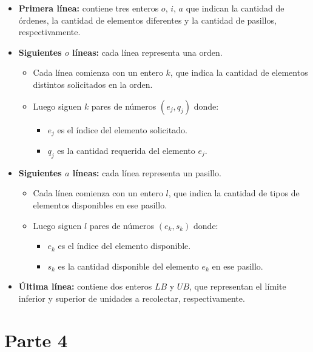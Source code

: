 \documentclass[a4paper,12pt]{article}
\begin{document}
\begin{itemize}
    \item \textbf{Primera línea:} contiene tres enteros $o$, $i$, $a$ que indican la cantidad de órdenes, la cantidad de elementos diferentes y la cantidad de pasillos, respectivamente.

    \item \textbf{Siguientes $o$ líneas:} cada línea representa una orden. 
    \begin{itemize}
        \item Cada línea comienza con un entero $k$, que indica la cantidad de elementos distintos solicitados en la orden.
        \item Luego siguen $k$ pares de números $(e_j, q_j)$ donde:
        \begin{itemize}
            \item $e_j$ es el índice del elemento solicitado.
            \item $q_j$ es la cantidad requerida del elemento $e_j$.
        \end{itemize}
    \end{itemize}

    \item \textbf{Siguientes $a$ líneas:} cada línea representa un pasillo.
    \begin{itemize}
        \item Cada línea comienza con un entero $l$, que indica la cantidad de tipos de elementos disponibles en ese pasillo.
        \item Luego siguen $l$ pares de números $(e_k, s_k)$ donde:
        \begin{itemize}
            \item $e_k$ es el índice del elemento disponible.
            \item $s_k$ es la cantidad disponible del elemento $e_k$ en ese pasillo.
        \end{itemize}
    \end{itemize}

    \item \textbf{Última línea:} contiene dos enteros $LB$ y $UB$, que representan el límite inferior y superior de unidades a recolectar, respectivamente.
\end{itemize}

\clearpage

\section{Parte 4}
\label{sec:variante4}
\end{document}
